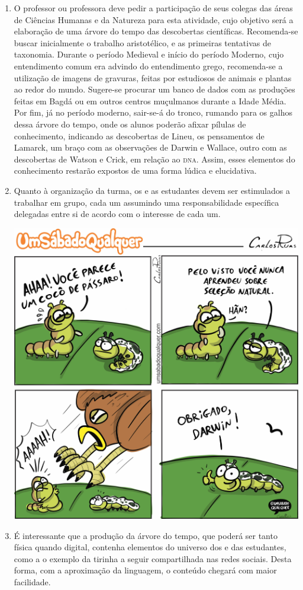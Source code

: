 \documentclass[11pt]{extarticle}
\begin{document}
\begin{enumerate}

	\item
	O professor ou professora deve pedir a participação de seus colegas das áreas de Ciências
	Humanas e da Natureza para esta atividade, cujo objetivo será a elaboração
	de uma árvore do tempo das descobertas científicas.
	Recomenda-se buscar inicialmente o trabalho	aristotélico, e as primeiras tentativas 
	de taxonomia. Durante o período Medieval e início do período Moderno, cujo entendimento comum era advindo do
	entendimento grego, recomenda-se a utilização de imagens de gravuras, feitas
	por estudiosos de animais e plantas ao redor do mundo. Sugere-se procurar um
	banco de dados com as produções feitas em Bagdá ou em outros centros muçulmanos
	durante a Idade Média.
	Por fim, já no período moderno, sair-se-á do tronco, rumando para os galhos
	dessa árvore do tempo, onde os alunos poderão afixar pílulas de conhecimento,
	indicando as descobertas de Lineu, os pensamentos de Lamarck, um braço com as
	observações de Darwin e Wallace, outro com as descobertas de Watson e Crick, em
	relação ao \textsc{dna}. Assim, esses elementos do conhecimento restarão expostos de uma forma lúdica
	e elucidativa.

	\item
	Quanto à organização da turma, os e as estudantes devem ser estimulados a trabalhar
	em grupo, cada um assumindo uma responsabilidade específica delegadas entre si
	de acordo com o interesse de cada um. 

\medskip
\includegraphics[width=.8\textwidth]{./images/PNLD0060-11}

	\item
	É interessante que a produção da árvore do tempo, que poderá ser tanto física
	quando digital, contenha elementos do universo dos e das estudantes, como 
	a o exemplo da tirinha a seguir compartilhada nas redes sociais. Desta forma,
	com a aproximação da linguagem, o conteúdo chegará com maior facilidade. 


\end{enumerate}
\end{document}
